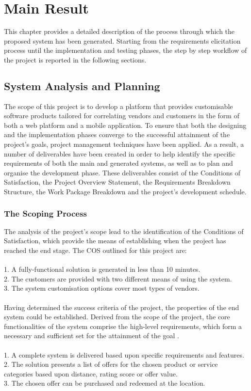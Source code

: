 \section{Main Result}
This chapter provides a detailed description of the process through which the proposed system has been generated. Starting from the requirements elicitation process until the implementation and testing phases, the step by step workflow of the project is reported in the following sections.

\subsection{System Analysis and Planning}
The scope of this project is to develop a platform that provides customisable software products tailored for correlating vendors and customers in the form of both a web platform and a mobile application. To ensure that both the designing and the implementation phases converge to the successful attainment of the project's goals, project management techniques have been applied. As a result, a number of deliverables have been created in order to help identify the specific requirements of both the main and generated systems, as well as to plan and organise the development phase. These deliverables consist of the Conditions of Satisfaction, the Project Overview Statement, the Requirements Breakdown Structure, the Work Package Breakdown and the project's development schedule. 

\subsubsection{The Scoping Process}
The analysis of the project's scope lead to the identification of the Conditions of Satisfaction, which provide the means of establishing when the project has reached the end stage. The COS outlined for this project are:\\\\
1. A fully-functional solution is generated in less than 10 minutes.\\
2. The customers are provided with two different means of using the system.\\
3. The system customisation options cover most types of vendors.\\\\

Having determined the success criteria of the project, the properties of the end system could be established. Derived from the scope of the project, the core functionalities of the system comprise the high-level requirements, which form a necessary and sufficient set for the attainment of the goal \cite{holyer_2016}.\\\\
1. A complete system is delivered based upon specific requirements and features.\\
2. The solution presents a list of offers for the chosen product or service categories based upon distance, rating score or offer value.\\
3. The chosen offer can be purchased and redeemed at the location.\\

